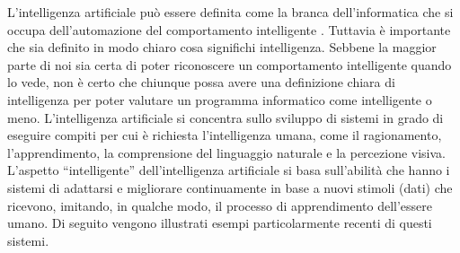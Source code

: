 \documentclass[12pt,italian]{report}
\begin{document}
	L'intelligenza artificiale può essere definita come la branca dell'informatica che si occupa dell'automazione del comportamento intelligente \cite{luger2005artificial}. Tuttavia 
	è importante che sia definito in modo chiaro cosa significhi intelligenza. Sebbene la maggior parte di noi sia certa di poter riconoscere un comportamento intelligente quando lo vede, non è certo che chiunque possa avere una definizione chiara di intelligenza per poter valutare un programma informatico come intelligente o meno.
	L'intelligenza artificiale si concentra sullo sviluppo di sistemi in grado di eseguire compiti per cui è richiesta l'intelligenza umana, come il ragionamento, l'apprendimento, la comprensione del linguaggio naturale e la percezione visiva. L'aspetto ``intelligente'' dell'intelligenza artificiale si basa sull'abilità che hanno i sistemi di adattarsi e migliorare continuamente in base a nuovi stimoli (dati) che ricevono, imitando, in qualche modo, il processo di apprendimento dell'essere umano.
	Di seguito vengono illustrati esempi particolarmente recenti di questi sistemi. 
\end{document}
